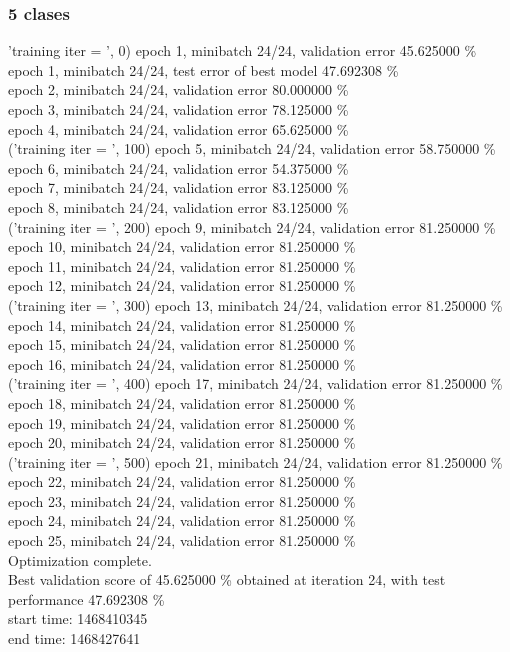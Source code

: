 \documentclass[a4paper]{article}
\begin{document}
\subsubsection{5 clases}
'training \@ iter = ', 0)
epoch 1, minibatch 24/24, validation error 45.625000 \% \\
     epoch 1, minibatch 24/24, test error of best model 47.692308 \% \\
epoch 2, minibatch 24/24, validation error 80.000000 \% \\
epoch 3, minibatch 24/24, validation error 78.125000 \% \\
epoch 4, minibatch 24/24, validation error 65.625000 \% \\
('training \@ iter = ', 100)
epoch 5, minibatch 24/24, validation error 58.750000 \% \\
epoch 6, minibatch 24/24, validation error 54.375000 \% \\
epoch 7, minibatch 24/24, validation error 83.125000 \% \\
epoch 8, minibatch 24/24, validation error 83.125000 \% \\
('training \@ iter = ', 200)
epoch 9, minibatch 24/24, validation error 81.250000 \% \\
epoch 10, minibatch 24/24, validation error 81.250000 \% \\
epoch 11, minibatch 24/24, validation error 81.250000 \% \\
epoch 12, minibatch 24/24, validation error 81.250000 \% \\
('training \@ iter = ', 300)
epoch 13, minibatch 24/24, validation error 81.250000 \% \\
epoch 14, minibatch 24/24, validation error 81.250000 \% \\
epoch 15, minibatch 24/24, validation error 81.250000 \% \\
epoch 16, minibatch 24/24, validation error 81.250000 \% \\
('training  \@ iter = ', 400)
epoch 17, minibatch 24/24, validation error 81.250000 \% \\
epoch 18, minibatch 24/24, validation error 81.250000 \% \\
epoch 19, minibatch 24/24, validation error 81.250000 \% \\
epoch 20, minibatch 24/24, validation error 81.250000 \% \\
('training \@ iter = ', 500)
epoch 21, minibatch 24/24, validation error 81.250000 \% \\
epoch 22, minibatch 24/24, validation error 81.250000 \% \\
epoch 23, minibatch 24/24, validation error 81.250000 \% \\
epoch 24, minibatch 24/24, validation error 81.250000 \% \\
epoch 25, minibatch 24/24, validation error 81.250000 \% \\
Optimization complete. \\
Best validation score of 45.625000 \% obtained at iteration 24, with test performance 47.692308 \% \\
start time: 1468410345 \\
end time: 1468427641 \\
\end{document}
